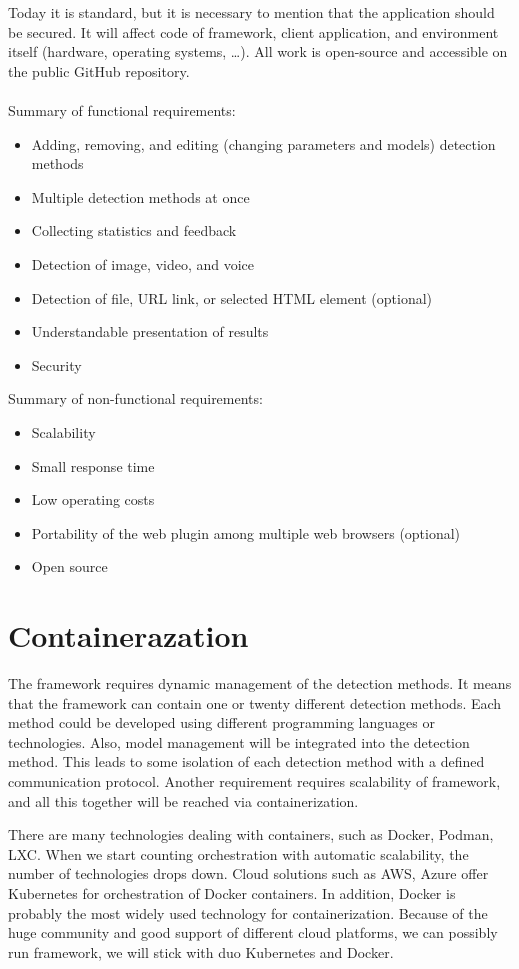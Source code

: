 Today it is standard, but it is necessary to mention that the application should be secured. It will affect code of framework, client application, and environment itself (hardware, operating systems, …). All work is open-source and accessible on the public GitHub repository.
\\\\
\noindent Summary of functional requirements:
\begin{itemize}
\item Adding, removing, and editing (changing parameters and models) detection methods
\item Multiple detection methods at once
\item Collecting statistics and feedback
\item Detection of image, video, and voice
\item Detection of file, URL link, or selected HTML element (optional)
\item Understandable presentation of results
\item Security    
\end{itemize}

\noindent Summary of non-functional requirements:
\begin{itemize}  
\item Scalability
\item Small response time
\item Low operating costs
\item Portability of the web plugin among multiple web browsers (optional)
\item Open source    
\end{itemize}

\section{Containerazation}

The framework requires dynamic management of the detection methods. It means that the framework can contain one or twenty different detection methods. Each method could be developed using different programming languages or technologies. Also, model management will be integrated into the detection method. This leads to some isolation of each detection method with a defined communication protocol. Another requirement requires scalability of framework, and all this together will be reached via containerization.

There are many technologies dealing with containers, such as Docker, Podman, LXC. When we start counting orchestration with automatic scalability, the number of technologies drops down. Cloud solutions such as AWS, Azure offer Kubernetes for orchestration of Docker containers. In addition, Docker is probably the most widely used technology for containerization. Because of the huge community and good support of different cloud platforms, we can possibly run framework, we will stick with duo Kubernetes and Docker.

